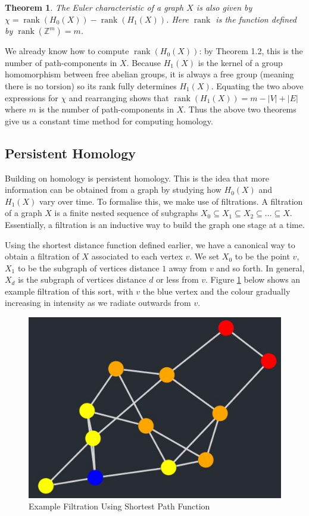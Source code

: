 \documentclass[12pt,a4paper]{amsart}
\numberwithin{equation}{section}
\def\Z{{\mathbb Z}}
\def\rank{\operatorname{rank}}
\theoremstyle{plain}
\newtheorem{Th}{Theorem}[section]
\theoremstyle{definition}
\begin{document}
\begin{Th}
The Euler characteristic of a graph $X$ is also given by $\chi = \rank(H_0(X)) - \rank(H_1(X))$. Here $\rank$ is the function defined by $\rank(\Z^m) = m$.
\end{Th}

We already know how to compute $\rank(H_0(X))$: by Theorem 1.2, this is the number of path-components in $X$. Because $H_1(X)$ is the kernel of a group homomorphism between free abelian groups, it is always a free group (meaning there is no torsion) so its rank fully determines $H_1(X)$. Equating the two above expressions for $\chi$ and rearranging shows that $\rank(H_1(X)) = m - |V| + |E|$ where $m$ is the number of path-components in $X$. Thus the above two theorems give us a constant time method for computing homology.

\subsection{Persistent Homology}

Building on homology is persistent homology. This is the idea that more information can be obtained from a graph by studying how $H_0(X)$ and $H_1(X)$ vary over time. To formalise this, we make use of filtrations. A filtration of a graph $X$ is a finite nested sequence of subgraphs $X_0 \subseteq X_1 \subseteq X_2 \subseteq ... \subseteq X$. Essentially, a filtration is an inductive way to build the graph one stage at a time. 

Using the shortest distance function defined earlier, we have a canonical way to obtain a filtration of $X$ associated to each vertex $v$. We set $X_0$ to be the point $v$, $X_1$ to be the subgraph of vertices distance $1$ away from $v$ and so forth. In general, $X_d$ is the subgraph of vertices distance $d$ or less from $v$. Figure \ref{filtration} below shows an example filtration of this sort, with $v$ the blue vertex and the colour gradually increasing in intensity as we radiate outwards from $v$.

\begin{figure}[h]
	\centering
	\includegraphics[scale=0.8]{ExampleFiltration.jpg}
	\caption{Example Filtration Using Shortest Path Function}
	\label{filtration}
\end{figure}
\end{document}
